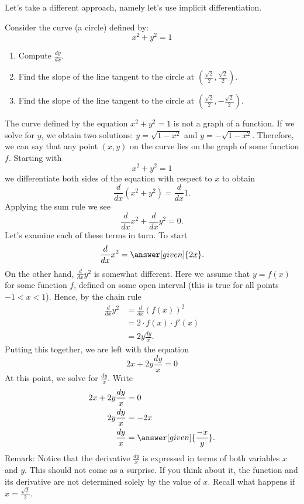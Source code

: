 \documentclass{ximera}
\begin{document}
Let's take a different approach, namely let's use implicit differentiation.
\begin{example}
Consider the curve (a circle) defined by:
\[
x^2 + y^2 = 1
\]
\begin{enumerate}
\item Compute $\frac{dy}{dx}$.
\item Find the slope of the line tangent to the circle at $\left(\frac{\sqrt{2}}{2},\frac{\sqrt{2}}{2}\right)$.
\item Find the slope of the line tangent to the circle at $\left(\frac{\sqrt{2}}{2},-\frac{\sqrt{2}}{2}\right)$.
\end{enumerate}
\begin{explanation}

The curve defined by the equation  $x^2 + y^2 = 1$ is not a graph of a function. If we solve for $y$, we obtain two solutions:
$y=\sqrt{1-x^2}$ and $y=-\sqrt{1-x^2}$. Therefore, we can say that  any point $(x,y)$ on the curve lies on the graph of some function $f$.
  Starting with 
\[
x^2 + y^2 = 1
\]
we differentiate both sides of the
equation with respect to $x$ to obtain
\[
\frac{d}{dx} \left(x^2+y^2\right) = \frac{d}{dx} 1.
\]
Applying the sum rule we see
\[
\frac{d}{dx} x^2+\frac{d}{dx} y^2 = 0.
\]
Let's examine each of these terms in turn. To start
\[
\frac{d}{dx} x^2 = \answer[given]{2x}.
\]
On the other hand, $\frac{d}{dx} y^2$ is somewhat different. Here we assume that $y = f(x)$ for some function $f$, defined on some open interval (this is true for all points $-1<x<1$). Hence, by the chain rule
\begin{align*}
\frac{d}{dx} y^2 &= \frac{d}{dx} (f(x))^2 \\ 
&= 2\cdot f(x) \cdot f'(x) \\
&= 2y\frac{dy}{x}.
\end{align*}
Putting this together, we are left with the equation
\[
2x + 2y\frac{dy}{x} =0
\]
At this point, we solve for $\frac{dy}{x}$. Write
\begin{align*}
2x + 2y\frac{dy}{x} &= 0\\
2y \frac{dy}{x} &= -2x\\
\frac{dy}{x} &= \answer[given]{\frac{-x}{y}}.
\end{align*}
Remark: Notice that the derivative $\frac{dy}{x} $ is expressed in terms of both variables $x$ and $y$. This should not come as a surprise. If you think about it, the function and  its derivative are not determined solely by the value of $x$. Recall what happens if $x=\frac{\sqrt{2}}{2}$.



\end{explanation}
\end{example}
\end{document}
